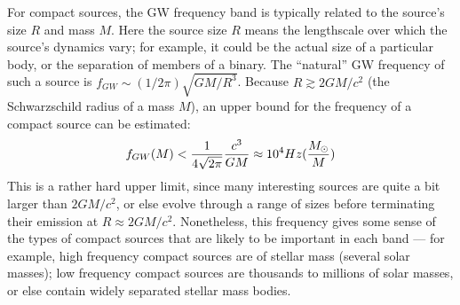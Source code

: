 \documentclass[binding=0.6cm, LaM]{sapthesis}
\begin{document}
For compact sources, the GW frequency band is typically related to the source’s size $R$ and mass $M$. 
Here the source size $R$ means the lengthscale over which the source’s dynamics vary; for example, it could be the actual size of a particular body, or the separation of members of a binary. 
The “natural” GW frequency of such a source is $f_{GW} \sim (1/2\pi)\sqrt{GM/R^3}$. Because $R \apprge 2GM/c^2$ (the Schwarzschild radius of a mass $M$), an upper bound for the frequency of a compact
 source can be estimated:
\begin{equation}
f_{GW}(M) < {1 \over {4\sqrt{2 \pi}}}{{c^3}\over{GM}} \approx 10^4 Hz ({{M_{\odot}} \over M})
\end{equation}
This is a rather hard upper limit, since many interesting sources are quite a bit larger than $2GM/c^2$, or else evolve through a range of sizes before terminating their emission at
 $R \approx 2GM/c^2$. Nonetheless, this frequency gives some sense of the types of compact sources that are likely to be important in each band — for example, 
high frequency compact sources are of stellar mass (several solar masses); 
low frequency compact sources are thousands to millions of solar masses, or else contain widely separated stellar mass bodies.
\end{document}
